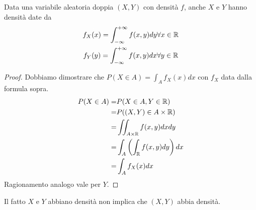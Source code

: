 \begin{proposition}
	Data una variabile aleatoria doppia $(X, Y)$ con densità $f$, anche $X$ e $Y$ hanno densità
	date da
	\begin{align*}
		f_X(x) = \int_{-\infty}^{+\infty} f(x,y) dy & \forall x \in \mathbb{R} \\
		f_Y(y) = \int_{-\infty}^{+\infty} f(x,y) dx & \forall y \in \mathbb{R}
	\end{align*}
	\begin{proof}
		Dobbiamo dimostrare che $P(X \in A) = \int_A f_X(x) dx$ con $f_X$ data dalla formula sopra.
		\begin{align*}
			P(X \in A) = & P(X \in A, Y \in \mathbb{R})                       \\
			=            & P((X, Y) \in A \times \mathbb{R})                  \\
			=            & \iint_{A \times \mathbb{R}} f(x,y) dx dy           \\
			=            & \int_A \left( \int_{\mathbb{R}} f(x,y) dy \right) dx \\
			=            & \int_A f_X (x) dx
		\end{align*}
		Ragionamento analogo vale per $Y$.
	\end{proof}
\end{proposition}

\begin{observation}
	Il fatto $X$ e $Y$ abbiano densità non implica che $(X,Y)$ abbia densità.
\end{observation}